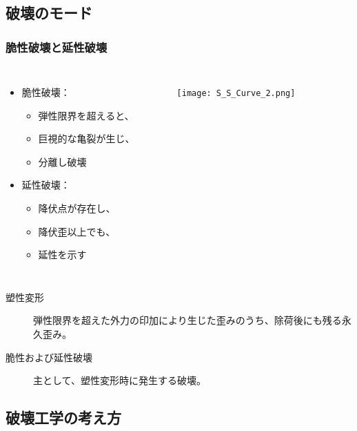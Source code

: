 \documentclass[1４pt, dvipdfmx]{beamer}
\begin{document}
\subsection{破壊のモード}
\begin{frame}
\frametitle{脆性破壊と延性破壊}

\begin{columns}[totalwidth=1\textwidth]
	\begin{itemize}
	\item 脆性破壊：
		\begin{itemize}
		\item 
		弾性限界を超えると、
		\item
		巨視的な亀裂が生じ、
		\item
		分離し破壊
		\end{itemize}
	\item 延性破壊：
		\begin{itemize}
		\item 
		降伏点が存在し、
		\item
		降伏歪以上でも、
		\item
		延性を示す
		\end{itemize}
	\end{itemize}
	\begin{figure}
	\centering
	\texttt{[image: S\_S\_Curve\_2.png]}
	\end{figure}
\end{columns}

\begin{description}
\item[塑性変形]
弾性限界を超えた外力の印加により生じた歪みのうち、除荷後にも残る永久歪み。
\item[脆性および延性破壊]
主として、塑性変形時に発生する破壊。
\end{description}
\end{frame}

\subsection{破壊工学の考え方}
\end{document}
